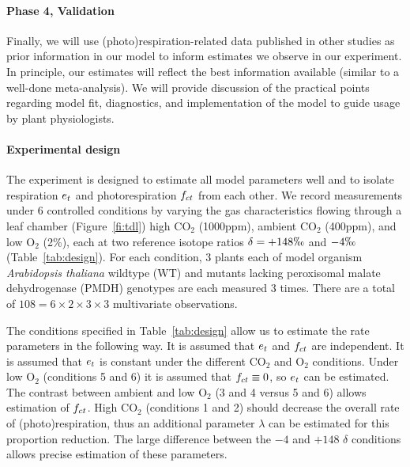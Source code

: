 \documentclass[12pt]{article}
\begin{document}
\paragraph{Phase 4, Validation}
Finally, we will use (photo)respiration-related data
  published in other studies as prior information in our model
  to inform estimates we observe in our experiment.
In principle, our estimates will reflect the best information available
  (similar to a well-done meta-analysis).
We will provide discussion of the practical points regarding model fit, diagnostics,
  and implementation of the model to guide usage by plant physiologists.

\paragraph{Experimental design}

The experiment is designed to estimate all model parameters well
  and to isolate respiration $e_{t}$ and photorespiration $f_{ct}$ from each other.
We record measurements under 6 controlled conditions
  by varying the gas characteristics flowing through a leaf chamber (Figure~\ref{fi:tdl})
  high CO$_2$ (1000ppm), ambient CO$_2$ (400ppm), and low O$_2$ (2\%),
  each at two reference isotope ratios $\delta=+148\permil$ and $-4\permil$ (Table~\ref{tab:design}).
For each condition, 3 plants each of model organism
  {\em Arabidopsis thaliana} wildtype (WT) and
  mutants lacking peroxisomal malate dehydrogenase (PMDH)
  genotypes
  are each measured 3 times.
There are a total of $108=6\times 2\times 3\times 3$ multivariate observations.

The conditions specified in Table~\ref{tab:design} allow us to estimate the rate parameters in the following way.
It is assumed that $e_{t}$ and $f_{ct}$ are independent.
It is assumed that $e_{t}$ is constant under the different CO$_2$ and O$_2$ conditions.
Under low O$_2$ (conditions 5 and 6) it is assumed that $f_{ct}\equiv 0$, so $e_{t}$ can be estimated.
The contrast between ambient and low O$_2$ (3 and 4 versus 5 and 6) allows estimation of $f_{ct}$.
High CO$_2$ (conditions 1 and 2) should decrease the overall rate of (photo)respiration,
  thus an additional parameter $\lambda$ can be estimated for this proportion reduction.
The large difference between the $-4$ and $+148$ $\delta$ conditions allows precise estimation
  of these parameters.
\end{document}
